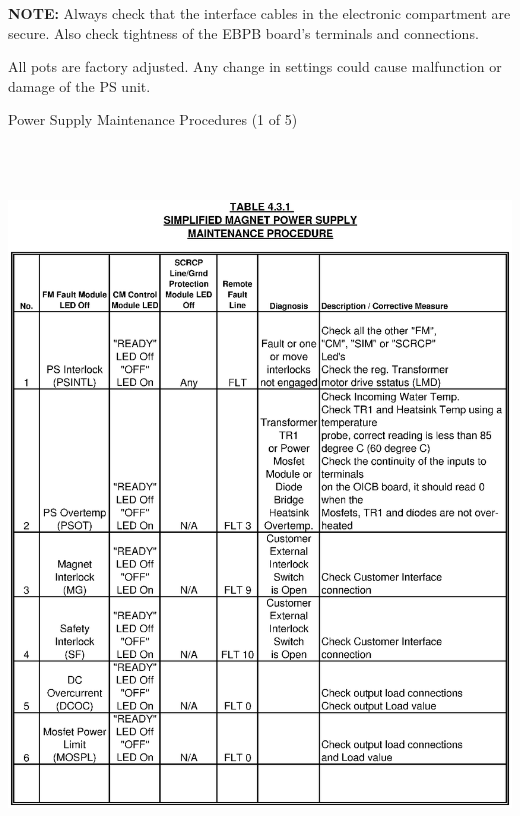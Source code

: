 {\bf NOTE:} Always check that the interface cables in the electronic
compartment are secure.  Also check tightness of the EBPB board's
terminals and connections.

All pots are factory adjusted.  Any change in settings could
cause malfunction or damage of the PS unit.


\clearpage
\begin{table}
\caption{Power Supply Maintenance Procedures (1 of 5) \label{tab:ps_maint_1}}
\includegraphics[height=7.5in,width=6.2in]{book1.ps}
\end{table}

